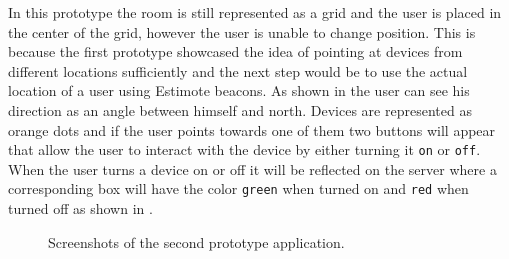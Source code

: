 In this prototype the room is still represented as a grid and the user is placed in the center of the grid, however the user is unable to change position.
This is because the first prototype showcased the idea of pointing at devices from different locations sufficiently and the next step would be to use the actual location of a user using Estimote beacons.
As shown in  the user can see his direction as an angle between himself and north.
Devices are represented as orange dots and if the user points towards one of them two buttons will appear that allow the user to interact with the device by either turning it \texttt{on} or \texttt{off}.
When the user turns a device on or off it will be reflected on the server where a corresponding box will have the color \texttt{green} when turned on and \texttt{red} when turned off as shown in .

\begin{figure}%
    \centering
    \caption{Screenshots of the second prototype application.}
    \label{fig:prototype2-app-screenshots}
\end{figure}

